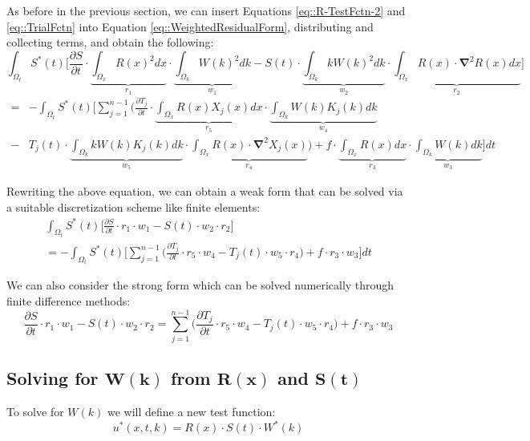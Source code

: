 \documentclass{article}
\def\ds{\displaystyle}
\def\pd{\partial}
\def\grad{\mathbf\nabla}
\begin{document}
As before in the previous section, we can insert Equations \ref{eq::R-TestFctn-2} and \ref{eq::TrialFctn} into Equation \ref{eq::WeightedResidualForm}, distributing and collecting terms, and obtain the following:
\begin{equation*}
\ds\int_{\Omega_t} S^*(t) \bigg[ \frac{\pd S}{\pd t} \cdot \underbrace{\ds\int_{\Omega_x} R(x)^2 dx}_{r_1} \cdot \underbrace{\ds\int_{\Omega_k}W(k)^2 dk}_{w_1} - S(t) \cdot \underbrace{\ds\int_{\Omega_k}kW(k)^2dk}_{w_2} \cdot \underbrace{\int_{\Omega_x} R(x)\cdot\grad^2R(x) dx}_{r_2} \bigg]
\end{equation*}\vspace{-15pt}
\begin{align}
= & - \ds\int_{\Omega_t} S^*(t) \Bigg[ \ds\sum_{j=1}^{n-1} \bigg( \frac{\pd T_j}{\pd t} \cdot  \underbrace{\ds\int_{\Omega_x} R(x) X_j(x) dx}_{r_5} \cdot \underbrace{\ds\int_{\Omega_k}W(k)K_j(k) dk}_{w_4} \nonumber\\
 - & T_j(t)\cdot \underbrace{\ds\int_{\Omega_k} kW(k)K_j(k)dk}_{w_5} \cdot \underbrace{\ds\int_{\Omega_x} R(x)\cdot\grad^2X_j(x)}_{r_4} \bigg) + f \cdot \underbrace{\ds\int_{\Omega_x} R(x)dx}_{r_3} \cdot \underbrace{\ds\int_{\Omega_k} W(k)dk}_{w_3} \Bigg] dt
\end{align}

Rewriting the above equation, we can obtain a weak form that can be solved via a suitable discretization scheme like finite elements:
\begin{gather}
\ds\int_{\Omega_t} S^*(t) \bigg[ \frac{\pd S}{\pd t} \cdot r_1 \cdot w_1- S(t) \cdot w_2 \cdot r_2 \bigg] \nonumber \\
= - \ds\int_{\Omega_t} S^*(t) \Bigg[ \ds\sum_{j=1}^{n-1} \bigg( \frac{\pd T_j}{\pd t} \cdot r_5 \cdot w_4 - T_j(t)\cdot w_5 \cdot r_4 \bigg) + f \cdot r_3 \cdot w_3 \Bigg] dt
\end{gather}

We can also consider the strong form which can be solved numerically through finite difference methods:
\begin{equation}
\label{eq::S-Strong}
\frac{\pd S}{\pd t} \cdot r_1 \cdot w_1 - S(t) \cdot w_2 \cdot r_2 = \ds\sum_{j=1}^{n-1} \bigg( \frac{\pd T_j}{\pd t} \cdot r_5 \cdot w_4 - T_j(t)\cdot w_5 \cdot r_4 \bigg) + f \cdot r_3 \cdot w_3
\end{equation}

\subsection{Solving for $\mathbf{W(k)}$ from $\mathbf{R(x)}$ and $\mathbf{S(t)}$}
To solve for $W(k)$ we will define a new test function:
\begin{equation}
\label{eq::R-TestFctn-3}
u^*(x,t,k) = R(x) \cdot S(t) \cdot W^*(k)
\end{equation}
\end{document}
